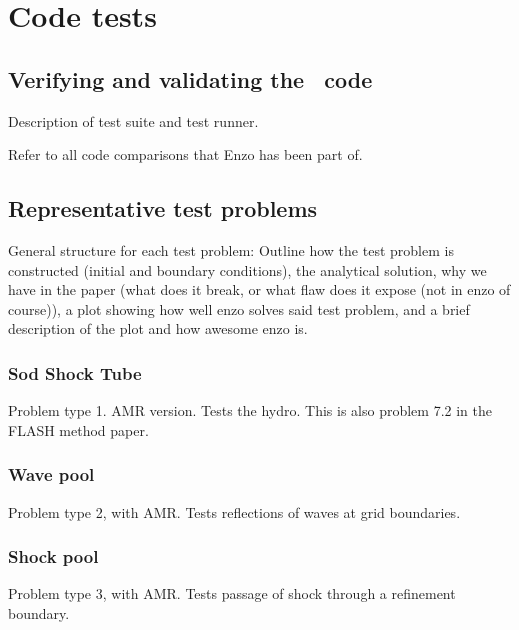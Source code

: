 
\section{Code tests}
\label{sec.tests}

\subsection{Verifying and validating the \enzo\ code}
\label{sec.tests.vandv}

 Description of test suite and test runner.

 Refer to all code comparisons that Enzo has been part of.

\subsection{Representative test problems}
\label{sec.tests.problems}

General structure for each test problem:  Outline how the test problem is constructed (initial and boundary conditions), 
the analytical solution, why we have in the paper (what does it break, or what flaw does it expose (not in enzo of course)),
a plot showing how well enzo solves said test problem, and a brief description of the plot and how awesome enzo is.

\subsubsection{Sod Shock Tube}
\label{sec.tests.sodshock}
Problem type 1.  AMR version.  Tests the hydro.
This is also problem 7.2 in the FLASH method paper.

\subsubsection{Wave pool}
\label{sec.tests.wavepool}
Problem type 2, with AMR.  Tests reflections of waves at grid boundaries.

\subsubsection{Shock pool}
\label{sec.tests.shockpool}
Problem type 3, with AMR.  Tests passage of shock through a refinement boundary.

